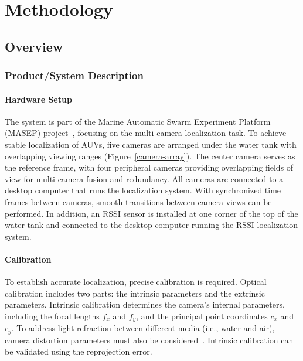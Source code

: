 \documentclass[11pt]{article}
\begin{document}
\section{Methodology}
    \subsection{Overview }
        \subsubsection{Product/System Description }
        \paragraph{Hardware Setup}
            The system is part of the Marine Automatic Swarm Experiment Platform (MASEP) project~\cite{cai_development_2024}, focusing on the multi-camera localization task. To achieve stable localization of AUVs, five cameras are arranged under the water tank with overlapping viewing ranges (Figure~\ref{camera-array}). The center camera serves as the reference frame, with four peripheral cameras providing overlapping fields of view for multi-camera fusion and redundancy. All cameras are connected to a desktop computer that runs the localization system. With synchronized time frames between cameras, smooth transitions between camera views can be performed. In addition, an RSSI sensor is installed at one corner of the top of the water tank and connected to the desktop computer running the RSSI localization system.
        \paragraph{Calibration}
            To establish accurate localization, precise calibration is required. Optical calibration includes two parts: the intrinsic parameters and the extrinsic parameters. Intrinsic calibration determines the camera's internal parameters, including the focal lengths $f_x$ and $f_y$, and the principal point coordinates $c_x$ and $c_y$. To address light refraction between different media (i.e., water and air), camera distortion parameters must also be considered~\cite{pedersen_camera_2018}. Intrinsic calibration can be validated using the reprojection error.
\end{document}
